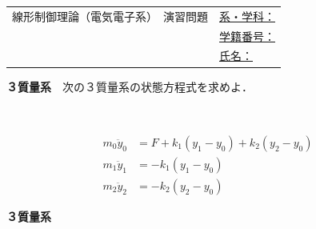 \documentclass[a4paper,11pt]{jreport}
\begin{document}
\begin{tabular}{cl}
\hspace*{2cm}
{\large 線形制御理論（電気電子系）　演習問題}
\hspace{1cm}
&
\underline{系・学科：\hspace{3cm}}
\\[2mm]
&\underline{学籍番号：\hspace{3cm}}
\\[2mm]
&\underline{氏名：\hspace{5cm}}
\end{tabular}

\noindent
{\bf ３質量系}　次の３質量系の状態方程式を求めよ．

\begin{minipage}{80mm}
\end{minipage}
\begin{minipage}{100mm}
\begin{align}
	m_0 \ddot{y}_0 & = F + k_1 (y_1 - y_0) + k_2 (y_2-y_0)
\nonumber \\
	m_1 \ddot{y}_1 & = - k_1 (y_1 - y_0)
\nonumber \\
	m_2 \ddot{y}_2 & = - k_2 (y_2 - y_0)
\nonumber
\end{align}
\end{minipage}


\newpage
\noindent
{\bf ３質量系}
\end{document}
